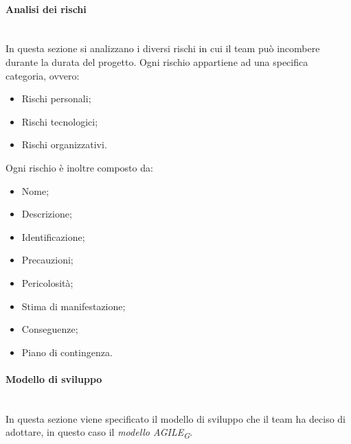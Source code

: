 \paragraph {Analisi dei rischi}\mbox{}\\
In questa sezione si analizzano i diversi rischi in cui il team può incombere durante la durata del progetto.
Ogni rischio appartiene ad una specifica categoria, ovvero:
\begin{itemize}
	\item Rischi personali;
	\item Rischi tecnologici;
	\item Rischi organizzativi.
\end{itemize}
Ogni rischio è inoltre composto da:
\begin{itemize}
	\item Nome;
	\item Descrizione;
	\item Identificazione;
	\item Precauzioni;
	\item Pericolosità;
	\item Stima di manifestazione;
	\item Conseguenze;
	\item Piano di contingenza.
\end{itemize}
\paragraph {Modello di sviluppo}\mbox{}\\
In questa sezione viene specificato il modello di sviluppo che il team ha deciso di adottare, in questo caso il \textit{modello AGILE\textsubscript{G}}.
